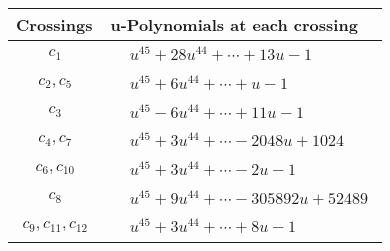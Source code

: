 \documentclass[1p]{elsarticle_modified}
\theoremstyle{definition}
\begin{document}
\begin{tabular}{m{50pt}|m{274pt}}
Crossings & \hspace{64pt}u-Polynomials at each crossing \\
\hline $$\begin{aligned}c_{1}\end{aligned}$$&$\begin{aligned}
&u^{45}+28 u^{44}+\cdots+13 u-1
\end{aligned}$\\
\hline $$\begin{aligned}c_{2},c_{5}\end{aligned}$$&$\begin{aligned}
&u^{45}+6 u^{44}+\cdots+u-1
\end{aligned}$\\
\hline $$\begin{aligned}c_{3}\end{aligned}$$&$\begin{aligned}
&u^{45}-6 u^{44}+\cdots+11 u-1
\end{aligned}$\\
\hline $$\begin{aligned}c_{4},c_{7}\end{aligned}$$&$\begin{aligned}
&u^{45}+3 u^{44}+\cdots-2048 u+1024
\end{aligned}$\\
\hline $$\begin{aligned}c_{6},c_{10}\end{aligned}$$&$\begin{aligned}
&u^{45}+3 u^{44}+\cdots-2 u-1
\end{aligned}$\\
\hline $$\begin{aligned}c_{8}\end{aligned}$$&$\begin{aligned}
&u^{45}+9 u^{44}+\cdots-305892 u+52489
\end{aligned}$\\
\hline $$\begin{aligned}c_{9},c_{11},c_{12}\end{aligned}$$&$\begin{aligned}
&u^{45}+3 u^{44}+\cdots+8 u-1
\end{aligned}$\\
\hline
\end{tabular}\\~\\
\newpage\renewcommand{\arraystretch}{1}
\end{document}
